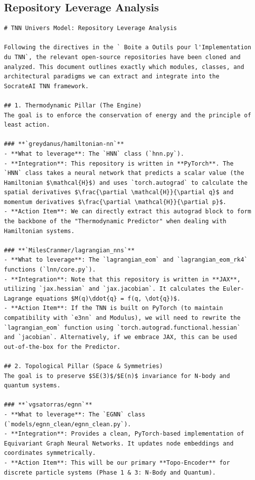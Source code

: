 \documentclass[11pt,a4paper]{article}
\begin{document}
\subsection{Repository Leverage Analysis}
\begin{lstlisting}[language={}, caption={}, basicstyle=\ttfamily\footnotesize, breaklines=true]
# TNN Univers Model: Repository Leverage Analysis

Following the directives in the ` Boite a Outils pour l'Implementation du TNN`, the relevant open-source repositories have been cloned and analyzed. This document outlines exactly which modules, classes, and architectural paradigms we can extract and integrate into the SocrateAI TNN framework.

## 1. Thermodynamic Pillar (The Engine)
The goal is to enforce the conservation of energy and the principle of least action.

### **`greydanus/hamiltonian-nn`**
- **What to leverage**: The `HNN` class (`hnn.py`).
- **Integration**: This repository is written in **PyTorch**. The `HNN` class takes a neural network that predicts a scalar value (the Hamiltonian $\mathcal{H}$) and uses `torch.autograd` to calculate the spatial derivatives $\frac{\partial \mathcal{H}}{\partial q}$ and momentum derivatives $\frac{\partial \mathcal{H}}{\partial p}$.
- **Action Item**: We can directly extract this autograd block to form the backbone of the "Thermodynamic Predictor" when dealing with Hamiltonian systems.

### **`MilesCranmer/lagrangian_nns`**
- **What to leverage**: The `lagrangian_eom` and `lagrangian_eom_rk4` functions (`lnn/core.py`).
- **Integration**: Note that this repository is written in **JAX**, utilizing `jax.hessian` and `jax.jacobian`. It calculates the Euler-Lagrange equations $M(q)\ddot{q} = f(q, \dot{q})$.
- **Action Item**: If the TNN is built on PyTorch (to maintain compatibility with `e3nn` and Modulus), we will need to rewrite the `lagrangian_eom` function using `torch.autograd.functional.hessian` and `jacobian`. Alternatively, if we embrace JAX, this can be used out-of-the-box for the Predictor.

## 2. Topological Pillar (Space & Symmetries)
The goal is to preserve $SE(3)$/$E(n)$ invariance for N-body and quantum systems.

### **`vgsatorras/egnn`**
- **What to leverage**: The `EGNN` class (`models/egnn_clean/egnn_clean.py`).
- **Integration**: Provides a clean, PyTorch-based implementation of Equivariant Graph Neural Networks. It updates node embeddings and coordinates symmetrically.
- **Action Item**: This will be our primary **Topo-Encoder** for discrete particle systems (Phase 1 & 3: N-Body and Quantum).


\end{lstlisting}
\end{document}

